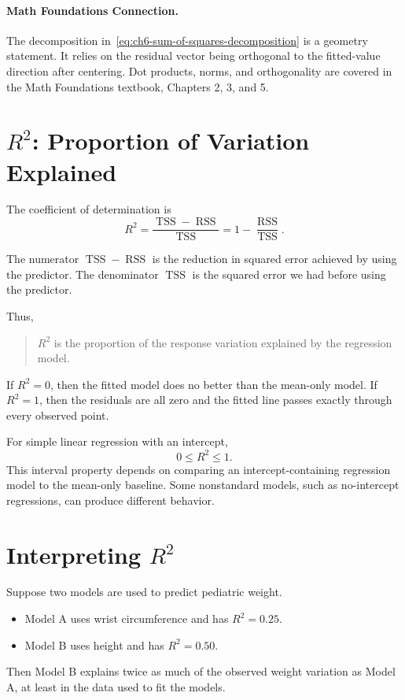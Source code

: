 \paragraph{Math Foundations Connection.}
The decomposition in~\eqref{eq:ch6-sum-of-squares-decomposition} is a geometry statement.  It relies on the residual vector being orthogonal to the fitted-value direction after centering.  Dot products, norms, and orthogonality are covered in the Math Foundations textbook, Chapters 2, 3, and 5.

\section{\texorpdfstring{$R^2$}{R-squared}: Proportion of Variation Explained}

The coefficient of determination is
\begin{equation}
  \boxed{R^2=\frac{\operatorname{TSS}-\operatorname{RSS}}{\operatorname{TSS}}
  =1-\frac{\operatorname{RSS}}{\operatorname{TSS}}.}
  \label{eq:ch6-r2}
\end{equation}

The numerator $\operatorname{TSS}-\operatorname{RSS}$ is the reduction in squared error achieved by using the predictor.  The denominator $\operatorname{TSS}$ is the squared error we had before using the predictor.

Thus,
\begin{quote}
  $R^2$ is the proportion of the response variation explained by the regression model.
\end{quote}

If $R^2=0$, then the fitted model does no better than the mean-only model.  If $R^2=1$, then the residuals are all zero and the fitted line passes exactly through every observed point.

For simple linear regression with an intercept,
\begin{equation}
  0\leq R^2\leq 1.
\end{equation}
This interval property depends on comparing an intercept-containing regression model to the mean-only baseline.  Some nonstandard models, such as no-intercept regressions, can produce different behavior.

\section{Interpreting \texorpdfstring{$R^2$}{R-squared}}

Suppose two models are used to predict pediatric weight.
\begin{itemize}
  \item Model A uses wrist circumference and has $R^2=0.25$.
  \item Model B uses height and has $R^2=0.50$.
\end{itemize}
Then Model B explains twice as much of the observed weight variation as Model A, at least in the data used to fit the models.

